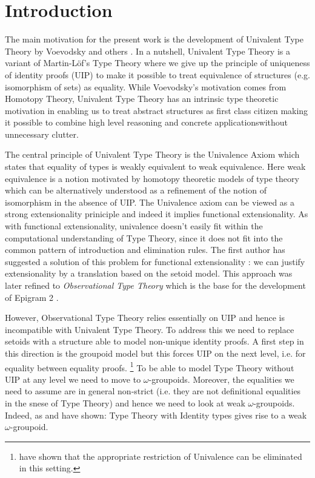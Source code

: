 \section{Introduction}

The main motivation for the present work is the development of
Univalent Type Theory by Voevodsky and others \cite{voevodsky}. In a
nutshell, Univalent Type Theory is a variant of Martin-L\"of's Type
Theory where we give up the principle of uniqueness of identity proofs
(UIP) to make it possible to treat equivalence of structures
(e.g. isomorphism of sets) as equality. While Voevodsky's motivation
comes from Homotopy Theory, Univalent Type Theory has an intrinsic
type theoretic motivation in enabling us to treat abstract structures
as first class citizen making it possible to combine high level
reasoning and concrete applicationswithout unnecessary clutter. 

The central principle of Univalent Type Theory is the Univalence Axiom
which states that equality of types is weakly equivalent to weak
equivalence. Here weak equivalence is a notion motivated by homotopy
theoretic models of type theory which can be alternatively understood
as a refinement of the notion of isomorphism in the absence of
UIP. The Univalence axiom can be viewed as a strong extensionality
priniciple and indeed it implies functional extensionality. As with
functional extensionality, univalence doesn't easily fit within the
computational understanding of Type Theory, since it does not fit into
the common pattern of introduction and elimination rules. The first
author has suggested a solution of this problem for functional
extensionality \cite{altenkirch99:extensional-equality}: we can justify extensionality by a
translation based on the setoid model. This approach was later refined
\cite{altenkirch07:observational-equality} to \emph{Observational Type Theory} which is the base
for the development of Epigram 2 \cite{epigram2}.

However, Observational Type Theory relies essentially on UIP and hence
is incompatible with Univalent Type Theory. To address this we need to
replace setoids with a structure able to model non-unique identity
proofs. A first step in this direction is the groupoid model
\cite{hofmann98:the-groupoid-interpretation} but this forces UIP on the next level, i.e. for
equality between equality proofs. 
\footnote{\cite{licata:2011} have shown that the appropriate
  restriction of Univalence can be eliminated in this setting.}
To be able to model Type Theory
without UIP at any level we need to move to
$\omega$-groupoids. Moreover, the equalities we need to assume are in
general non-strict (i.e. they are not definitional equalities in the
snese of Type Theory) and hence we need to look at weak
$\omega$-groupoids. Indeed, as \cite{berg08:types-are} and \cite{lumsdaine10:weak-o-categories} have
shown: Type Theory with Identity types gives rise to a weak
$\omega$-groupoid. 

